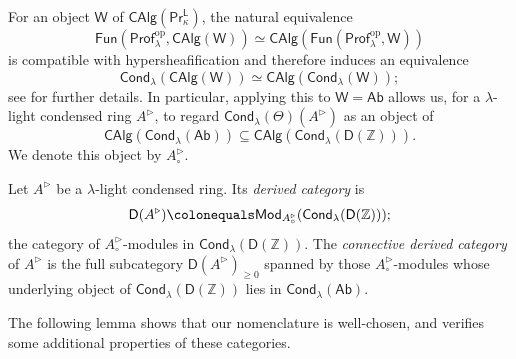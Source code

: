 For an object $\mathsf{W}$ of $\mathsf{CAlg}(\mathsf{Pr}^\mathsf{L}_\kappa)$, the natural equivalence
\[\mathsf{Fun}(\mathsf{Prof}_\lambda^\mathrm{op},\mathsf{CAlg}(\mathsf{W}))\simeq \mathsf{CAlg}(\mathsf{Fun}(\mathsf{Prof}_\lambda^\mathrm{op},\mathsf{W}))\]
is compatible with hypersheafification and therefore induces an equivalence
\[\mathsf{Cond}_\lambda(\mathsf{CAlg}(\mathsf{W}))\simeq\mathsf{CAlg}(\mathsf{Cond}_\lambda(\mathsf{W}));\]
see \cite[Prop.~2.1.6]{montagnani2025axiomaticapproachanalytic1affineness} for further details.
In particular, applying this to $\mathsf{W}=\mathsf{Ab}$ allows us, for a $\lambda$-light condensed ring $A^\triangleright$, to regard $\mathsf{Cond}_\lambda(\Theta)(A^\triangleright)$ as an object of
\[\mathsf{CAlg}(\mathsf{Cond}_\lambda(\mathsf{Ab}))\subseteq \mathsf{CAlg}(\mathsf{Cond}_\lambda(\mathsf{D}(\mathbb{Z}))).\] 
We denote this object by $A^\triangleright_\circ$.

\begin{definition}\label{derived category of a condensed ring}
Let $A^\triangleright$ be a $\lambda$-light condensed ring. Its \emph{derived category} is
\[\mathsf{D}(A^\triangleright)\colonequals\mathsf{Mod}_{A^\triangleright_\circ}\mleft(\mathsf{Cond}_\lambda(\mathsf{D}(\mathbb{Z}))\mright);\]
the category of $A^\triangleright_\circ$-modules in $\mathsf{Cond}_\lambda(\mathsf{D}(\mathbb{Z}))$. The \emph{connective derived category} of $A^\triangleright$ is the full subcategory $\mathsf{D}(A^{\triangleright})_{\geq0}$ spanned by those $A^{\triangleright}_{\circ}$-modules whose underlying object of $\mathsf{Cond}_{\lambda}(\mathsf{D}(\mathbb{Z}))$ lies in $\mathsf{Cond}_{\lambda}(\mathsf{Ab})$. 
\end{definition}

The following lemma shows that our nomenclature is well-chosen, and verifies some additional properties of these categories.

